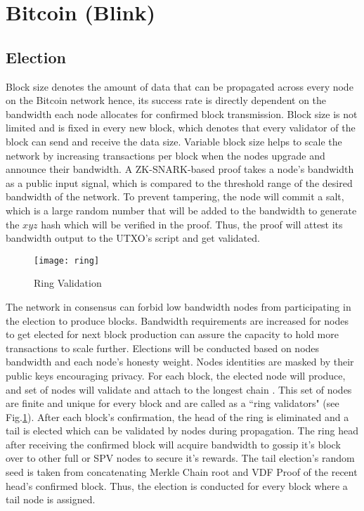 \documentclass[../Bitcoin Blink.tex]{subfiles}
\begin{document}
\section{Bitcoin (Blink)} 
\subsection{Election}
Block size denotes the amount of data that can be propagated across every node on the Bitcoin network hence, its success rate is directly dependent on the bandwidth each node allocates for confirmed block transmission. Block size is not limited and is fixed in every new block, which denotes that every validator of the block can send and receive the data size. Variable block size helps to scale the network by increasing transactions per block when the nodes upgrade and announce their bandwidth. A ZK-SNARK-based proof takes a node’s bandwidth as a public input signal, which is compared to the threshold range of the desired bandwidth of the network. To prevent tampering, the node will commit a salt, which is a large random number that will be added to the bandwidth to generate the $xyz$ hash which will be verified in the proof. Thus, the proof will attest its bandwidth output to the UTXO’s script and get validated. 
\begin{figure}[h]
\begin{center}
\texttt{[image: ring]}
\caption{Ring Validation}
\label{ring}
\end{center}
\end{figure}
The network in consensus can forbid low bandwidth nodes from participating in the election to produce blocks. Bandwidth requirements are increased for nodes to get elected for next block production can assure the capacity to hold more transactions to scale further. Elections will be conducted based on nodes bandwidth and each node's honesty weight. Nodes identities are masked by their public keys encouraging privacy. For each block, the elected node will produce, and set of nodes will validate and attach to the longest chain \cite{nakamoto2008bitcoin} . This set of nodes are finite and unique for every block and are called as a ``ring validators" (see Fig.\ref{ring}). After each block's confirmation, the head of the ring is eliminated and a tail is elected which can be validated by nodes during propagation. The ring head after receiving the confirmed block will acquire bandwidth to gossip it's block over to other full or SPV nodes to secure it's rewards. The tail election's random seed is taken from concatenating Merkle Chain root and VDF Proof \cite{yakovenko2018solana} of the recent head's confirmed block. Thus, the election is conducted for every block where a tail node is assigned.
\end{document}
